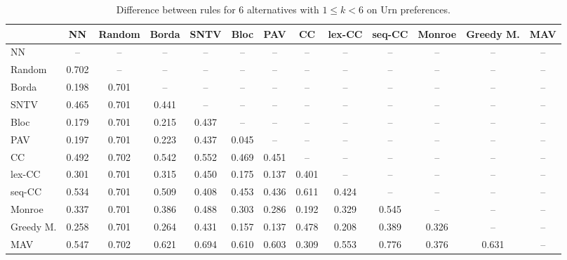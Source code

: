 
\begin{table*}[htbp]
\centering
\begin{tabular}{lcccccccccccc}
\toprule
 & NN & Random & Borda & SNTV & Bloc & PAV & CC & lex-CC & seq-CC & Monroe & Greedy M. & MAV \\
\midrule
NN & -- & -- & -- & -- & -- & -- & -- & -- & -- & -- & -- & -- \\
Random & \cellcolor{blue!70} 0.702 & -- & -- & -- & -- & -- & -- & -- & -- & -- & -- & -- \\
Borda & \cellcolor{blue!19} 0.198 & \cellcolor{blue!70} 0.701 & -- & -- & -- & -- & -- & -- & -- & -- & -- & -- \\
SNTV & \cellcolor{blue!46} 0.465 & \cellcolor{blue!70} 0.701 & \cellcolor{blue!44} 0.441 & -- & -- & -- & -- & -- & -- & -- & -- & -- \\
Bloc & \cellcolor{blue!17} 0.179 & \cellcolor{blue!70} 0.701 & \cellcolor{blue!21} 0.215 & \cellcolor{blue!43} 0.437 & -- & -- & -- & -- & -- & -- & -- & -- \\
PAV & \cellcolor{blue!19} 0.197 & \cellcolor{blue!70} 0.701 & \cellcolor{blue!22} 0.223 & \cellcolor{blue!43} 0.437 & \cellcolor{blue!4} 0.045 & -- & -- & -- & -- & -- & -- & -- \\
CC & \cellcolor{blue!49} 0.492 & \cellcolor{blue!70} 0.702 & \cellcolor{blue!54} 0.542 & \cellcolor{blue!55} 0.552 & \cellcolor{blue!46} 0.469 & \cellcolor{blue!45} 0.451 & -- & -- & -- & -- & -- & -- \\
lex-CC & \cellcolor{blue!30} 0.301 & \cellcolor{blue!70} 0.701 & \cellcolor{blue!31} 0.315 & \cellcolor{blue!45} 0.450 & \cellcolor{blue!17} 0.175 & \cellcolor{blue!13} 0.137 & \cellcolor{blue!40} 0.401 & -- & -- & -- & -- & -- \\
seq-CC & \cellcolor{blue!53} 0.534 & \cellcolor{blue!70} 0.701 & \cellcolor{blue!50} 0.509 & \cellcolor{blue!40} 0.408 & \cellcolor{blue!45} 0.453 & \cellcolor{blue!43} 0.436 & \cellcolor{blue!61} 0.611 & \cellcolor{blue!42} 0.424 & -- & -- & -- & -- \\
Monroe & \cellcolor{blue!33} 0.337 & \cellcolor{blue!70} 0.701 & \cellcolor{blue!38} 0.386 & \cellcolor{blue!48} 0.488 & \cellcolor{blue!30} 0.303 & \cellcolor{blue!28} 0.286 & \cellcolor{blue!19} 0.192 & \cellcolor{blue!32} 0.329 & \cellcolor{blue!54} 0.545 & -- & -- & -- \\
Greedy M. & \cellcolor{blue!25} 0.258 & \cellcolor{blue!70} 0.701 & \cellcolor{blue!26} 0.264 & \cellcolor{blue!43} 0.431 & \cellcolor{blue!15} 0.157 & \cellcolor{blue!13} 0.137 & \cellcolor{blue!47} 0.478 & \cellcolor{blue!20} 0.208 & \cellcolor{blue!38} 0.389 & \cellcolor{blue!32} 0.326 & -- & -- \\
MAV & \cellcolor{blue!54} 0.547 & \cellcolor{blue!70} 0.702 & \cellcolor{blue!62} 0.621 & \cellcolor{blue!69} 0.694 & \cellcolor{blue!61} 0.610 & \cellcolor{blue!60} 0.603 & \cellcolor{blue!30} 0.309 & \cellcolor{blue!55} 0.553 & \cellcolor{blue!77} 0.776 & \cellcolor{blue!37} 0.376 & \cellcolor{blue!63} 0.631 & -- \\
\bottomrule
\end{tabular}

\caption{Difference between rules for 6 alternatives with $1 \leq k < 6$ on Urn preferences.}
\label{tab:rule_distance_heatmap-m=[6]-pref_dist=URN-R}
\end{table*}
    